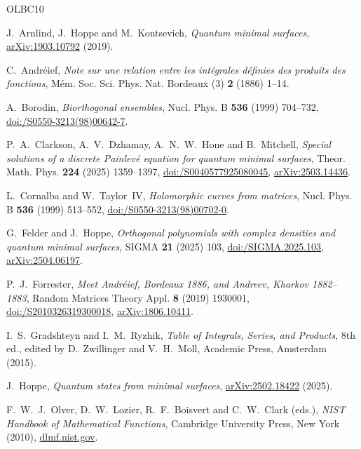 \documentclass[twoside,10pt]{article}
\numberwithin{equation}{section}
\theoremstyle{slbody}
\theoremstyle{remark}
\begin{document}
\begin{thebibliography}{OLBC10}

J.~Arnlind, J.~Hoppe and M.~Kontsevich,
\emph{Quantum minimal surfaces},
\href{https://arxiv.org/abs/1903.10792}{arXiv:1903.10792} (2019).

C.~Andr\'eief,
\emph{Note sur une relation entre les int\'egrales d\'efinies des
produits des fonctions},
M\'em. Soc. Sci. Phys. Nat. Bordeaux (3) \textbf{2} (1886) 1--14.

A.~Borodin,
\emph{Biorthogonal ensembles},
Nucl. Phys. B \textbf{536} (1999) 704--732,
\href{https://doi.org/10.1016/S0550-3213(98)00642-7}%
{doi:/S0550-3213(98)00642-7}.

P.~A.~Clarkson, A.~V.~Dzhamay, A.~N.~W.~Hone and B.~Mitchell,
\emph{Special solutions of a discrete Painlev\'e equation for quantum
minimal surfaces},
Theor. Math. Phys. \textbf{224} (2025) 1359--1397,
\href{https://doi.org/10.1134/S0040577925080045}%
{doi:/S0040577925080045},
\href{https://arxiv.org/abs/2503.14436}{arXiv:2503.14436}.

L.~Cornalba and W.~Taylor~IV,
\emph{Holomorphic curves from matrices},
Nucl. Phys. B \textbf{536} (1999) 513--552,
\href{https://doi.org/10.1016/S0550-3213(98)00702-0}%
{doi:/S0550-3213(98)00702-0}.

G.~Felder and J.~Hoppe,
\emph{Orthogonal polynomials with complex densities and quantum minimal
surfaces},
SIGMA \textbf{21} (2025) 103,
\href{https://doi.org/10.3842/SIGMA.2025.103}%
{doi:/SIGMA.2025.103},
\href{https://arxiv.org/abs/2504.06197}{arXiv:2504.06197}.

P.~J.~Forrester,
\emph{Meet Andr\'eief, Bordeaux 1886, and Andreev, Kharkov 1882--1883},
Random Matrices Theory Appl. \textbf{8} (2019) 1930001,
\href{https://doi.org/10.1142/S2010326319300018}%
{doi:/S2010326319300018},
\href{https://arxiv.org/abs/1806.10411}{arXiv:1806.10411}.

I.~S.~Gradshteyn and I.~M.~Ryzhik,
\emph{Table of Integrals, Series, and Products},
8th ed., edited by D.~Zwillinger and V.~H.~Moll, Academic Press,
Amsterdam (2015).

J.~Hoppe,
\emph{Quantum states from minimal surfaces},
\href{https://arxiv.org/abs/2502.18422}{arXiv:2502.18422} (2025).

F.~W.~J.~Olver, D.~W.~Lozier, R.~F.~Boisvert and C.~W.~Clark (eds.),
\emph{NIST Handbook of Mathematical Functions},
Cambridge University Press, New York (2010),
\href{https://dlmf.nist.gov/}{dlmf.nist.gov}.

\end{thebibliography}
\end{document}
